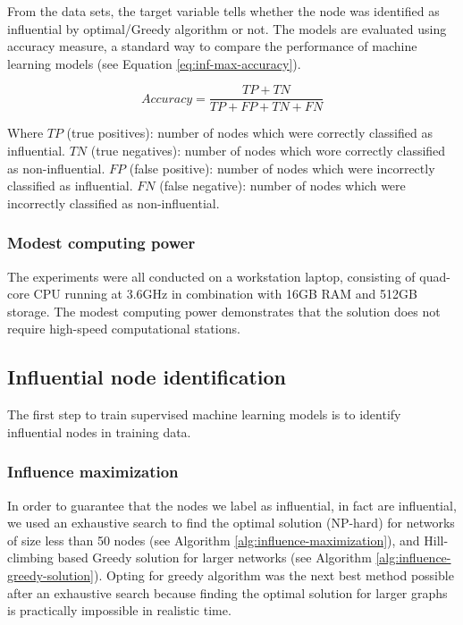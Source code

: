 			From the data sets, the target variable tells whether the node was identified as influential by optimal/Greedy algorithm or not. The models are evaluated using accuracy measure, a standard way to compare the performance of machine learning models (see Equation \ref{eq:inf-max-accuracy}).
			
			\begin{equation}
				\label{eq:inf-max-accuracy}
				Accuracy=\frac{TP+TN}{TP+FP+TN+FN}
			\end{equation}
			
			Where $TP$ (true positives): number of nodes which were correctly classified as influential. $TN$ (true negatives): number of nodes which wore correctly classified as non-influential. $FP$ (false positive): number of nodes which were incorrectly classified as influential. $FN$ (false negative): number of nodes which were incorrectly classified as non-influential.
			
			\subsubsection{Modest computing power}
			The experiments were all conducted on a workstation laptop, consisting of quad-core CPU running at 3.6GHz in combination with 16GB RAM and 512GB storage. The modest computing power demonstrates that the solution does not require high-speed computational stations.
			
		\subsection{Influential node identification}
		The first step to train supervised machine learning models is to identify influential nodes in training data.
		
			\subsubsection{Influence maximization}
			In order to guarantee that the nodes we label as influential, in fact are influential, we used an exhaustive search to find the optimal solution (NP-hard) for networks of size less than 50 nodes (see Algorithm \ref{alg:influence-maximization}), and Hill-climbing based Greedy solution for larger networks (see Algorithm \ref{alg:influence-greedy-solution}). Opting for greedy algorithm was the next best method possible after an exhaustive search because finding the optimal solution for larger graphs is practically impossible in realistic time.
			
